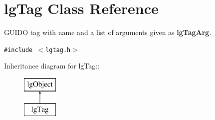 \section{lg\-Tag Class Reference}
\label{classlgTag}
GUIDO tag with name and a list of arguments given as {\bf lg\-Tag\-Arg}.  


{\tt \#include $<$lgtag.h$>$}

Inheritance diagram for lg\-Tag::\begin{figure}[H]
\begin{center}
\leavevmode
\includegraphics[height=2cm]{classlgTag}
\end{center}
\end{figure}
